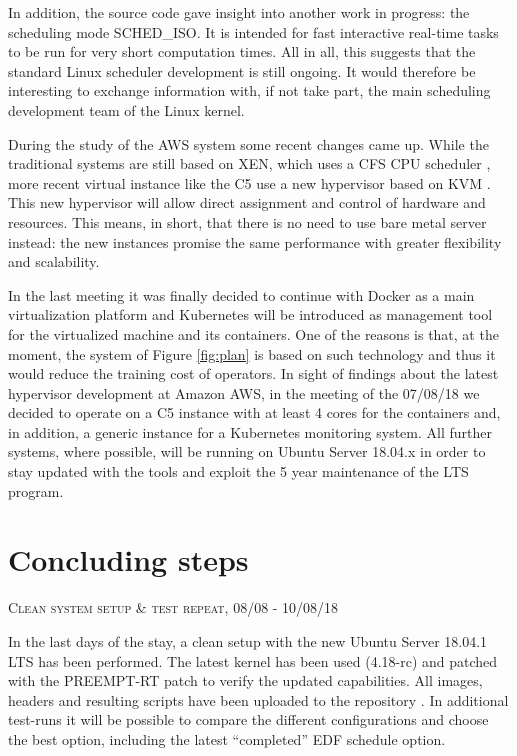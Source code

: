 \documentclass[]{scrartcl}
\begin{document}
In addition, the source code gave insight into another work in progress: the scheduling mode SCHED\_ISO. It is intended for fast interactive real-time tasks to be run for very short computation times. All in all, this suggests that the standard Linux scheduler  development is still ongoing.
It would therefore be interesting to exchange information with, if not take part, the main scheduling development team of the Linux kernel.

During the study of the AWS system some recent changes came up. While the traditional systems are still based on XEN, which uses a CFS CPU scheduler \cite{xen01}, more recent virtual instance like the C5 use a new hypervisor based on KVM \cite{amazon01}.
This new hypervisor will allow direct assignment and control of hardware and resources.
This means, in short, that there is no need to use bare metal server instead: the new instances promise the same performance with greater flexibility and scalability.

In the last meeting it was finally decided to continue with Docker as a main virtualization platform and Kubernetes will be introduced as management tool for the virtualized machine and its containers.
One of the reasons is that, at the moment, the system of Figure \ref{fig:plan} is based on such technology and thus it would reduce the training cost of operators.
In sight of findings about the latest hypervisor development at Amazon AWS, in the meeting of the 07/08/18 we decided to operate on a C5 instance with at least 4 cores for the containers and, in addition, a generic instance for a Kubernetes monitoring system.
All further systems, where possible, will be running on Ubuntu Server 18.04.x in order to stay updated with the tools and exploit the 5 year maintenance of the LTS program.

\section{Concluding steps}

{\small\textsc{Clean system setup \& test repeat, 08/08 - 10/08/18} \bigskip}

In the last days of the stay, a clean setup with the new Ubuntu Server 18.04.1 LTS has been performed. The latest kernel has been used (4.18-rc) and patched with the PREEMPT-RT patch to verify the updated capabilities. 
All images, headers and resulting scripts have been uploaded to the repository \cite{gitrepo}. In additional test-runs it will be possible to compare the different configurations and choose the best option, including the latest ``completed'' EDF schedule option.
\end{document}
